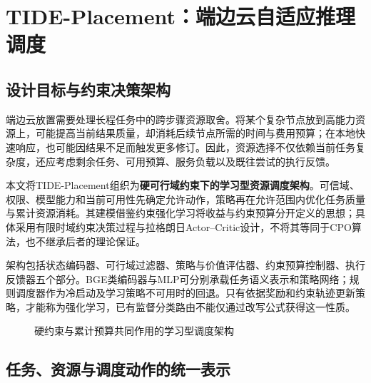 \section{TIDE-Placement：端边云自适应推理调度}
\label{sec:tide_placement}

\subsection{设计目标与约束决策架构}

端边云放置需要处理长程任务中的跨步骤资源取舍。将某个复杂节点放到高能力资源上，可能提高当前结果质量，却消耗后续节点所需的时间与费用预算；在本地快速响应，也可能因结果不足而触发更多修订。因此，资源选择不仅依赖当前任务复杂度，还应考虑剩余任务、可用预算、服务负载以及既往尝试的执行反馈。

本文将TIDE-Placement组织为\textbf{硬可行域约束下的学习型资源调度架构}。可信域、权限、模型能力和当前可用性先确定允许动作，策略再在允许范围内优化任务质量与累计资源消耗。其建模借鉴约束强化学习将收益与约束预算分开定义的思想\cite{tide_cpo}；具体采用有限时域约束决策过程与拉格朗日Actor--Critic设计，不将其等同于CPO算法，也不继承后者的理论保证。

架构包括状态编码器、可行域过滤器、策略与价值评估器、约束预算控制器、执行反馈器五个部分。BGE类编码器与MLP可分别承载任务语义表示和策略网络；规则调度器作为冷启动及学习策略不可用时的回退。只有依据奖励和约束轨迹更新策略，才能称为强化学习，已有监督分类路由不能仅通过改写公式获得这一性质。

\begin{figure}[htbp]
\centering
{}
\caption{硬约束与累计预算共同作用的学习型调度架构}
\label{fig:tide-placement-loop}
\end{figure}

\subsection{任务、资源与调度动作的统一表示}

